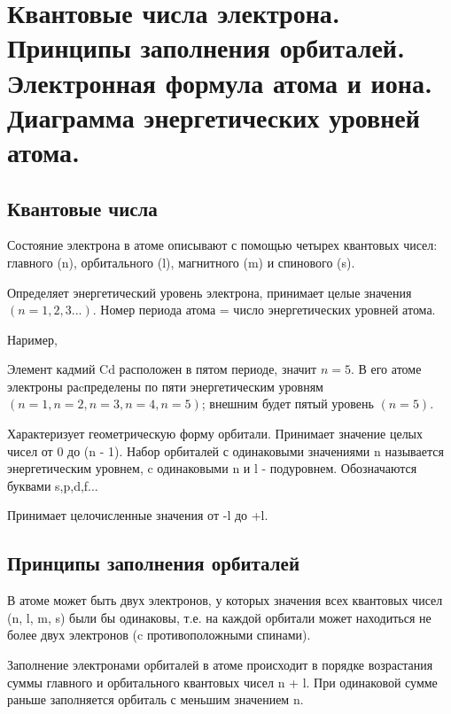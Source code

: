 \section{Квантовые числа электрона. Принципы заполнения орбиталей. Электронная формула атома и иона. Диаграмма энергетических уровней атома.}

\subsection{Квантовые числа}
Состояние электрона в атоме описывают с помощью четырех квантовых чисел: главного (n), орбитального (l), магнитного (m) и спинового (s).

 


Определяет энергетический уровень электрона, принимает целые значения $(n = 1, 2, 3 ...)$. Номер периода атома = число энергетических уровней атома.

Наример,

Элемент кадмий Cd расположен в пятом периоде, значит $n = 5$. В его атоме электроны раcпределены по пяти энергетическим уровням $(n = 1, n = 2, n = 3, n = 4, n = 5)$; внешним будет пятый уровень $(n = 5)$. 


 Характеризует геометрическую форму орбитали. Принимает значение целых чисел от 0 до (n - 1). Набор орбиталей с одинаковыми значениями n называется энергетическим уровнем, c одинаковыми n и l - подуровнем. Обозначаются буквами s,p,d,f...
 
 
 Принимает целочисленные значения от -l до +l. 
 
 \subsection{Принципы заполнения орбиталей}
 
 
 В атоме может быть двух электронов, у которых значения всех квантовых чисел (n, l, m, s) были бы одинаковы, т.е. на каждой орбитали может находиться не более двух электронов (c противоположными спинами).
 
 
 Заполнение электронами орбиталей в атоме происходит в порядке возрастания суммы главного и орбитального квантовых чисел n + l. При одинаковой сумме раньше заполняется орбиталь с меньшим значением n.

